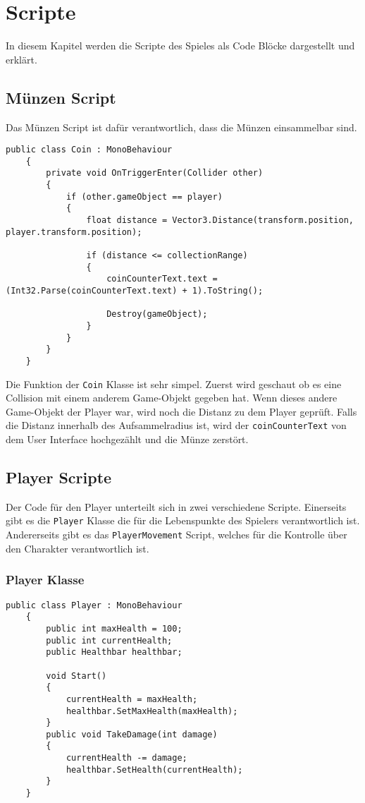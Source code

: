 \pagebreak
\chapter{Scripte}
In diesem Kapitel werden die Scripte des Spieles als Code Blöcke dargestellt und erklärt. 

\section{Münzen Script}
Das Münzen Script ist dafür verantwortlich, dass die Münzen einsammelbar sind. 
\begin{lstlisting}[language=CSharp,caption={Coin Klasse.},label=code:coin]
    public class Coin : MonoBehaviour
    {
        private void OnTriggerEnter(Collider other)
        {
            if (other.gameObject == player)
            {
                float distance = Vector3.Distance(transform.position, player.transform.position);
                
                if (distance <= collectionRange)
                {
                    coinCounterText.text = (Int32.Parse(coinCounterText.text) + 1).ToString();
                    
                    Destroy(gameObject);
                }
            }
        }
    }
\end{lstlisting}   

Die Funktion der \verb+Coin+ Klasse ist sehr simpel. Zuerst wird geschaut ob es eine Collision mit einem anderem Game-Objekt gegeben hat. Wenn dieses andere Game-Objekt der Player war, wird noch die Distanz zu dem Player geprüft. Falls die Distanz innerhalb des Aufsammelradius ist, wird der \verb+coinCounterText+ von dem User Interface hochgezählt und die Münze zerstört.


\pagebreak
\section{Player Scripte}
Der Code für den Player unterteilt sich in zwei verschiedene Scripte. Einerseits gibt es die \verb+Player+ Klasse die für die Lebenspunkte des Spielers verantwortlich ist. Andererseits gibt es das \verb+PlayerMovement+ Script, welches für die Kontrolle über den Charakter verantwortlich ist. \\

\subsection{Player Klasse}
\begin{lstlisting}[language=CSharp,caption={Player Klasse.},label=code:player]
    public class Player : MonoBehaviour
    {
        public int maxHealth = 100;
        public int currentHealth;
        public Healthbar healthbar;
        
        void Start()
        {
            currentHealth = maxHealth;
            healthbar.SetMaxHealth(maxHealth);
        }
        public void TakeDamage(int damage)
        {
            currentHealth -= damage;
            healthbar.SetHealth(currentHealth);
        }
    }
\end{lstlisting}

